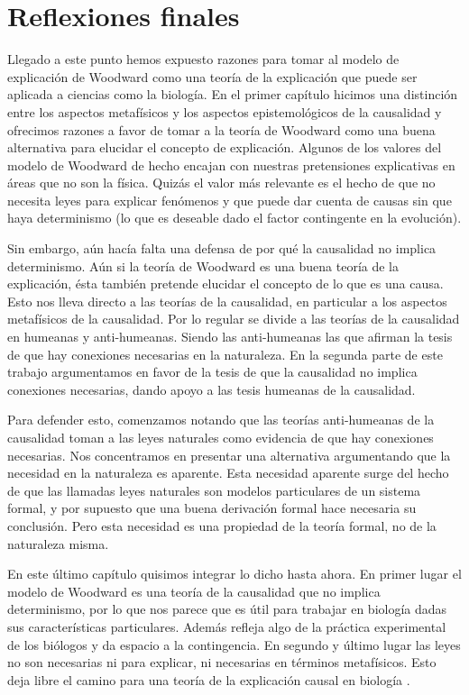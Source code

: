 
\chapter*{Reflexiones finales}

\noindent Llegado a este punto hemos expuesto razones para tomar al modelo de explicación de Woodward como una teoría de la explicación que puede ser aplicada a ciencias como la biología. En el primer capítulo hicimos una distinción entre los aspectos metafísicos y los aspectos epistemológicos de la causalidad y ofrecimos razones a favor de tomar a la teoría de Woodward como una buena alternativa para elucidar el concepto de explicación. Algunos de los valores del modelo de Woodward de hecho encajan con nuestras pretensiones explicativas en áreas que no son la física. Quizás el valor más relevante es el hecho de que no necesita leyes para explicar fenómenos y que puede dar cuenta de causas sin que haya determinismo (lo que es deseable dado el factor contingente en la evolución).

Sin embargo, aún hacía falta una defensa de por qué la causalidad no implica determinismo. Aún si la teoría de Woodward es una buena teoría de la explicación, ésta también pretende elucidar el concepto de lo que es una causa. Esto nos lleva directo a las teorías de la causalidad, en particular a los aspectos metafísicos de la causalidad. Por lo regular se divide a las teorías de la causalidad en humeanas y anti-humeanas. Siendo las anti-humeanas las que afirman la tesis de que hay conexiones necesarias en la naturaleza. En la segunda parte de este trabajo argumentamos en favor de la tesis de que la causalidad no implica conexiones necesarias, dando apoyo a las tesis humeanas de la causalidad.

Para defender esto, comenzamos notando que las teorías anti-humeanas de la causalidad toman a las leyes naturales como evidencia de que hay conexiones necesarias. Nos concentramos en presentar una alternativa argumentando que la necesidad en la naturaleza es aparente. Esta necesidad aparente surge del hecho de que las llamadas leyes naturales son modelos particulares de un sistema formal, y por supuesto que una buena derivación formal hace necesaria su conclusión. Pero esta necesidad es una propiedad de la teoría formal, no de la naturaleza misma.

En este último capítulo quisimos integrar lo dicho hasta ahora. En primer lugar el modelo de Woodward es una teoría de la causalidad que no implica determinismo, por lo que nos parece que es útil para trabajar en biología dadas sus características particulares. Además refleja algo de la práctica experimental de los biólogos y da espacio a la contingencia. En segundo y último lugar las leyes no son necesarias ni para explicar, ni necesarias en términos metafísicos. Esto deja libre el camino para una teoría de la explicación causal en biología .

